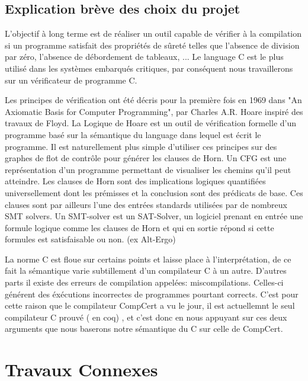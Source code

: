 \label{sec:2}
\subsection{Explication brève des choix du projet}
	
	L'objectif à long terme est de réaliser un outil capable de vérifier à la compilation si un programme satisfait des propriétés de sûreté telles que l'absence de division par zéro, l'absence de débordement de tableaux, ...
	Le language C est le plus utilisé dans les systèmes embarqués critiques, par conséquent nous travaillerons sur un vérificateur de programme C.

	Les principes de vérification ont été décris pour la première fois en 1969 dans "An Axiomatic Basis for Computer Programming", par Charles A.R. Hoare inspiré des travaux de Floyd.
	La Logique de Hoare est un outil de vérification formelle d'un programme basé sur la sémantique du language dans lequel est écrit le programme. 
	Il est naturellement plus simple d'utiliser ces principes sur des graphes de flot de contrôle pour générer les clauses de Horn. 
	Un CFG est une représentation d'un programme permettant de visualiser les chemins qu'il peut atteindre.
	Les clauses de Horn sont des implications logiques quantifiées universellement dont les prémisses et la conclusion sont des prédicats de base.
	Ces clauses sont par ailleurs l'une des entrées standards utilisées par de nombreux SMT solvers. 
	Un SMT-solver est un SAT-Solver, un logiciel prenant en entrée une formule logique comme les clauses de Horn et qui en sortie répond si cette formules est satisfaisable ou non. (ex Alt-Ergo)


	La norme C est floue sur certains points et laisse place à l'interprétation, de ce fait la sémantique varie subtillement d'un compilateur C à un autre.
D'autres parts il existe des erreurs de compilation appelées: miscompilations. Celles-ci générent des éxécutions incorrectes de programmes pourtant corrects. C'est pour cette raison que le compilateur CompCert a vu le jour, il est actuellemnt le seul compilateur C prouvé ( en coq) , et c'est donc en nous appuyant sur ces deux arguments que nous baserons notre sémantique du C sur celle de CompCert.



\section{Travaux Connexes}
\label{sec:1}
